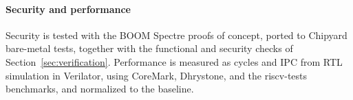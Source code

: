 
\paragraph{Security and performance}
Security is tested with the BOOM Spectre proofs of concept, ported to Chipyard 
bare-metal tests, together with the functional and security checks of 
Section~\ref{sec:verification}. Performance is measured as cycles and IPC from RTL simulation in Verilator, 
using CoreMark, Dhrystone, and the riscv-tests benchmarks, and normalized to the baseline.

